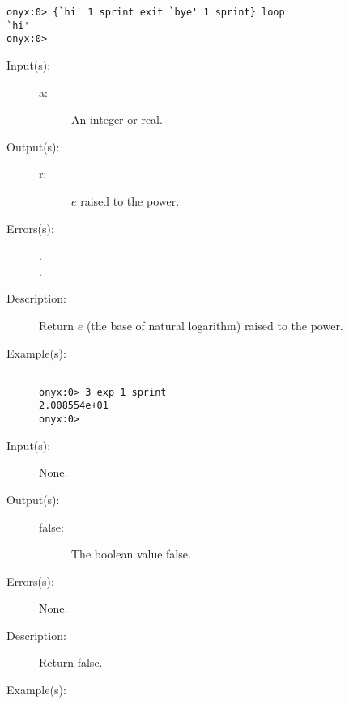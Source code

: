\begin{description}
\begin{description}
\begin{verbatim}
onyx:0> {`hi' 1 sprint exit `bye' 1 sprint} loop
`hi'
onyx:0>
		\end{verbatim}
	\end{description}
\label{systemdict:exp}
\item[{\onyxop{b}{exp}{r}}: ]
	\begin{description}\item[]
	\item[Input(s): ]
		\begin{description}\item[]
		\item[a: ]
			An integer or real.
		\end{description}
	\item[Output(s): ]
		\begin{description}\item[]
		\item[r: ]
			$e$ raised to the  power.
		\end{description}
	\item[Errors(s): ]
		\begin{description}\item[]
		\item[.]
		\item[.]
		\end{description}
	\item[Description: ]
		Return $e$ (the base of natural logarithm) raised to the
		 power.
	\item[Example(s): ]\begin{verbatim}

onyx:0> 3 exp 1 sprint
2.008554e+01
onyx:0>
		\end{verbatim}
	\end{description}
\label{systemdict:false}
\item[{\onyxop{--}{false}{false}}: ]
	\begin{description}\item[]
	\item[Input(s): ] None.
	\item[Output(s): ]
		\begin{description}\item[]
		\item[false: ]
			The boolean value false.
		\end{description}
	\item[Errors(s): ] None.
	\item[Description: ]
		Return false.
	\item[Example(s): ]\begin{verbatim}


\end{verbatim}
\end{description}
\end{description}
